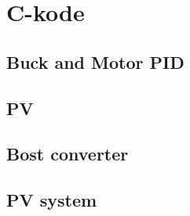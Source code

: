\section{C-kode}
\subsection{Buck and Motor PID}






\subsection{PV}

\subsection{Bost converter}

\subsection{PV system}
